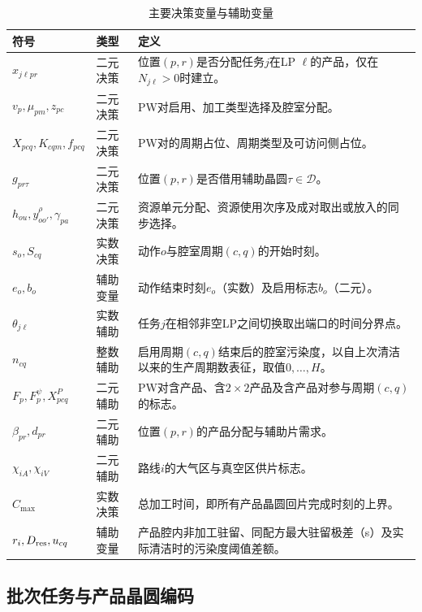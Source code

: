 \documentclass[preprint,12pt,nonatbib]{elsarticle}
\begin{document}
\begin{table}[!htbp]
\centering\small
\caption{主要决策变量与辅助变量}
\label{tab:symbol-cn-b}
\renewcommand{\arraystretch}{1.05}
\setlength{\tabcolsep}{4pt}
\begin{tabular}{@{}C{0.20\textwidth}C{0.16\textwidth}C{\textwidth-16pt\relax}@{}}
\toprule
符号 & 类型 & 定义\\\midrule
$x_{j\ell pr}$ & 二元决策 & 位置$(p,r)$是否分配任务$j$在LP $\ell$的产品，仅在$N_{j\ell}>0$时建立。\\
$v_p,\mu_{pm},z_{pc}$ & 二元决策 & PW对启用、加工类型选择及腔室分配。\\
$X_{pcq},K_{cqm},f_{pcq}$ & 二元决策 & PW对的周期占位、周期类型及可访问侧占位。\\
$g_{pr\tau}$ & 二元决策 & 位置$(p,r)$是否借用辅助晶圆$\tau\in\mathcal D$。\\
$h_{ou},y^\rho_{oo'},\gamma_{pa}$ & 二元决策 & 资源单元分配、资源使用次序及成对取出或放入的同步选择。\\
$s_o,S_{cq}$ & 实数决策 & 动作$o$与腔室周期$(c,q)$的开始时刻。\\
$e_o,b_o$ & 辅助变量 & 动作结束时刻$e_o$（实数）及启用标志$b_o$（二元）。\\
$\theta_{j\ell}$ & 实数辅助 & 任务$j$在相邻非空LP之间切换取出端口的时间分界点。\\
$n_{cq}$ & 整数辅助 & 启用周期$(c,q)$结束后的腔室污染度，以自上次清洁以来的生产周期数表征，取值$0,\ldots,H$。\\
$F_p,F_p^\psi,X^P_{pcq}$ & 二元辅助 & PW对含产品、含$2\times2$产品及含产品对参与周期$(c,q)$的标志。\\
$\beta_{pr},d_{pr}$ & 二元辅助 & 位置$(p,r)$的产品分配与辅助片需求。\\
$\chi_{iA},\chi_{iV}$ & 二元辅助 & 路线$i$的大气区与真空区供片标志。\\
$C_{\max}$ & 实数决策 & 总加工时间，即所有产品晶圆回片完成时刻的上界。\\
$r_i,D_{\rm res},u_{cq}$ & 辅助变量 & 产品腔内非加工驻留、同配方最大驻留极差（s）及实际清洁时的污染度阈值差额。\\
\bottomrule
\end{tabular}
\end{table}

\FloatBarrier
\subsection{批次任务与产品晶圆编码}
\label{sec:model-encoding-cn}
\end{document}
